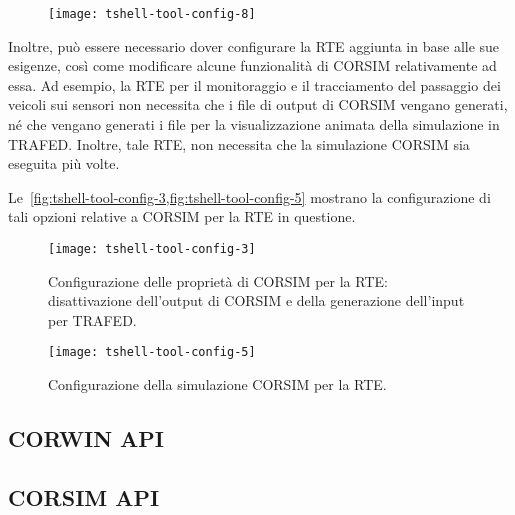 \begin{figure}[ht]
\centering
\texttt{[image: tshell-tool-config-8]}
\caption[Collegamento delle funzioni della \acs{RTE} a \acs{CORSIM}]{\omissis{}}
\label{fig:tshell-tool-config-8}
\end{figure}

Inoltre, può essere necessario dover configurare la \acs{RTE} aggiunta in base alle sue esigenze, così come modificare alcune funzionalità di \acs{CORSIM} relativamente ad essa. Ad esempio, la \acs{RTE} per il monitoraggio e il tracciamento del passaggio dei veicoli sui sensori non necessita che i file di output di \acs{CORSIM} vengano generati, né che vengano generati i file per la visualizzazione animata della simulazione in \acs{TRAFED}. Inoltre, tale \acs{RTE}, non necessita che la simulazione \acs{CORSIM} sia eseguita più volte.

Le~\vref{fig:tshell-tool-config-3,fig:tshell-tool-config-5} mostrano la configurazione di tali opzioni relative a \acs{CORSIM} per la \acs{RTE} in questione.


\begin{figure}[h]
\centering
\texttt{[image: tshell-tool-config-3]}
\caption[Configurazione delle proprietà di \acs{CORSIM}]{Configurazione delle proprietà di \acs{CORSIM} per la \acs{RTE}: disattivazione dell'output di \acs{CORSIM} e della generazione dell'input per \acs{TRAFED}.}
\label{fig:tshell-tool-config-3}
\end{figure}

\begin{figure}[h]
\centering
\texttt{[image: tshell-tool-config-5]}
\caption[Configurazione della simulazione \acs{CORSIM}]{Configurazione della simulazione \acs{CORSIM} per la \acs{RTE}.}
\label{fig:tshell-tool-config-5}
\end{figure}

\subsection{CORWIN API}

\subsection{CORSIM API}




\omissis{}




